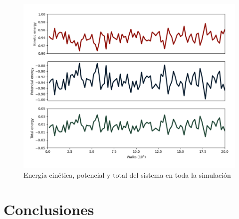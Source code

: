 \documentclass[reprint,amsmath,amssymb,aps,]{revtex4-2}
\begin{document}
\begin{figure}[H]
    \hspace{-0.5cm}
    \includegraphics[scale=0.35]{../Graphics/Energy.png}
    \caption{Energía cinética, potencial y total del sistema en toda la simulación}
    \label{energias}
\end{figure}
\section{Conclusiones}
\end{document}
